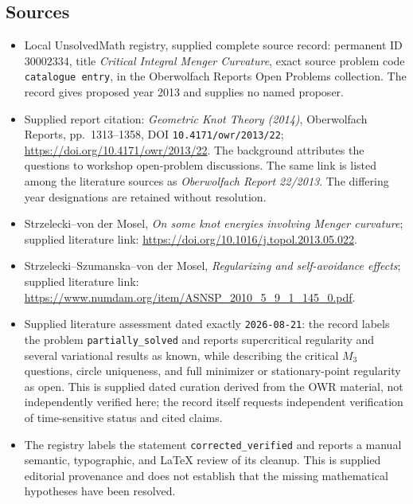 \documentclass[11pt]{article}
\begin{document}
\subsection{Sources}
\begin{itemize}
\item Local UnsolvedMath registry, supplied complete source record: permanent ID \(30002334\), title \emph{Critical Integral Menger Curvature}, exact source problem code \texttt{catalogue entry}, in the Oberwolfach Reports Open Problems collection. The record gives proposed year 2013 and supplies no named proposer.
\item Supplied report citation: \emph{Geometric Knot Theory (2014)}, Oberwolfach Reports, pp.\ 1313--1358, DOI \texttt{10.4171/owr/2013/22}; \url{https://doi.org/10.4171/owr/2013/22}. The background attributes the questions to workshop open-problem discussions. The same link is listed among the literature sources as \emph{Oberwolfach Report 22/2013}. The differing year designations are retained without resolution.
\item Strzelecki--von der Mosel, \emph{On some knot energies involving Menger curvature}; supplied literature link: \url{https://doi.org/10.1016/j.topol.2013.05.022}.
\item Strzelecki--Szumanska--von der Mosel, \emph{Regularizing and self-avoidance effects}; supplied literature link: \url{https://www.numdam.org/item/ASNSP_2010_5_9_1_145_0.pdf}.
\item Supplied literature assessment dated exactly \texttt{2026-08-21}: the record labels the problem \texttt{partially\_solved} and reports supercritical regularity and several variational results as known, while describing the critical \(M_3\) questions, circle uniqueness, and full minimizer or stationary-point regularity as open. This is supplied dated curation derived from the OWR material, not independently verified here; the record itself requests independent verification of time-sensitive status and cited claims.
\item The registry labels the statement \texttt{corrected\_verified} and reports a manual semantic, typographic, and LaTeX review of its cleanup. This is supplied editorial provenance and does not establish that the missing mathematical hypotheses have been resolved.
\end{itemize}
\end{document}
